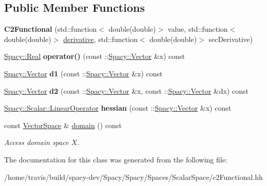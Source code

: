 \subsection*{\-Public \-Member \-Functions}
\begin{DoxyCompactItemize}
\item 
\hypertarget{classSpacy_1_1Scalar_1_1C2Functional_a6458c77ba0a55aace7bd3e739078b25b}{{\bfseries \-C2\-Functional} (std\-::function$<$ double(double)$>$ value, std\-::function$<$ double(double)$>$ \hyperlink{namespaceSpacy_a002fe344fa6d04a6ac59a74ea25fddb6}{derivative}, std\-::function$<$ double(double)$>$ sec\-Derivative)}\label{classSpacy_1_1Scalar_1_1C2Functional_a6458c77ba0a55aace7bd3e739078b25b}

\item 
\hypertarget{classSpacy_1_1Scalar_1_1C2Functional_a925d8325d3d58de9ccf82fb4c20a7f87}{\hyperlink{classSpacy_1_1Real}{\-Spacy\-::\-Real} {\bfseries operator()} (const \-::\hyperlink{classSpacy_1_1Vector}{\-Spacy\-::\-Vector} \&x) const }\label{classSpacy_1_1Scalar_1_1C2Functional_a925d8325d3d58de9ccf82fb4c20a7f87}

\item 
\hypertarget{classSpacy_1_1Scalar_1_1C2Functional_ac6baf3f5a3e1fbb1a2dc8172b0d471d5}{\hyperlink{classSpacy_1_1Vector}{\-Spacy\-::\-Vector} {\bfseries d1} (const \-::\hyperlink{classSpacy_1_1Vector}{\-Spacy\-::\-Vector} \&x) const }\label{classSpacy_1_1Scalar_1_1C2Functional_ac6baf3f5a3e1fbb1a2dc8172b0d471d5}

\item 
\hypertarget{classSpacy_1_1Scalar_1_1C2Functional_adcb4d9ed480a86199c82f1d1a97fe6dc}{\hyperlink{classSpacy_1_1Vector}{\-Spacy\-::\-Vector} {\bfseries d2} (const \-::\hyperlink{classSpacy_1_1Vector}{\-Spacy\-::\-Vector} \&x, const \-::\hyperlink{classSpacy_1_1Vector}{\-Spacy\-::\-Vector} \&dx) const }\label{classSpacy_1_1Scalar_1_1C2Functional_adcb4d9ed480a86199c82f1d1a97fe6dc}

\item 
\hypertarget{classSpacy_1_1Scalar_1_1C2Functional_aee5a5f9a601aa339c67ec57e44806343}{\hyperlink{structSpacy_1_1Scalar_1_1LinearOperator}{\-Spacy\-::\-Scalar\-::\-Linear\-Operator} {\bfseries hessian} (const \-::\hyperlink{classSpacy_1_1Vector}{\-Spacy\-::\-Vector} \&x) const }\label{classSpacy_1_1Scalar_1_1C2Functional_aee5a5f9a601aa339c67ec57e44806343}

\item 
\hypertarget{classSpacy_1_1FunctionalBase_a2d3397deb9fa1ad85ed04e37a03b3aa6}{const \hyperlink{classSpacy_1_1VectorSpace}{\-Vector\-Space} \& \hyperlink{classSpacy_1_1FunctionalBase_a2d3397deb9fa1ad85ed04e37a03b3aa6}{domain} () const }\label{classSpacy_1_1FunctionalBase_a2d3397deb9fa1ad85ed04e37a03b3aa6}

\begin{DoxyCompactList}\small\item\em \-Access domain space $X$. \end{DoxyCompactList}\end{DoxyCompactItemize}


\-The documentation for this class was generated from the following file\-:\begin{DoxyCompactItemize}
\item 
/home/travis/build/spacy-\/dev/\-Spacy/\-Spacy/\-Spaces/\-Scalar\-Space/c2\-Functional.\-hh\end{DoxyCompactItemize}
